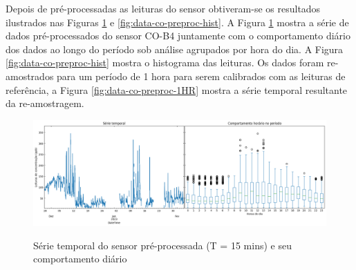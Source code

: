 Depois de pré-processadas as leituras do sensor obtiveram-se os resultados ilustrados nas Figuras \ref{fig:data-co-preproc-15} e \ref{fig:data-co-preproc-hist}. A Figura \ref{fig:data-co-preproc-15} mostra a série de dados pré-processados do sensor CO-B4 juntamente com o comportamento diário dos dados ao longo do período sob análise agrupados por hora do dia. A Figura \ref{fig:data-co-preproc-hist} mostra o histograma das leituras. Os dados foram re-amostrados para um período de 1 hora para serem calibrados com as leituras de referência, a Figura \ref{fig:data-co-preproc-1HR} mostra a série temporal resultante da re-amostragem.

\begin{figure}[h]
    \centering
    \caption{Série temporal do sensor pré-processada (T = 15 mins) e seu comportamento diário}
    \includegraphics[width=\textwidth]{chapters/3-RESULTADOS CAMPO/Figuras/preproc-co-b4.png}
    \label{fig:data-co-preproc-15}
\end{figure}

